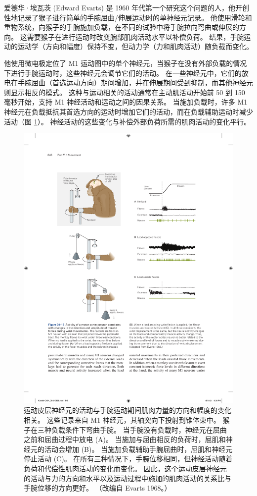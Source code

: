 爱德华·埃瓦茨 (Edward Evarts) 是 1960 年代第一个研究这个问题的人，他开创性地记录了猴子进行简单的手腕屈曲/伸展运动时的单神经元记录。 他使用滑轮和重物系统，向猴子的手腕施加负载，在不同的试验中将手腕拉向弯曲或伸展的方向。 这需要猴子在进行运动时改变腕部肌肉活动水平以补偿负荷。 结果，手腕运动的运动学（方向和幅度）保持不变，但动力学（力和肌肉活动）随负载而变化。

他使用微电极定位了 M1 运动图中的单个神经元，当猴子在没有外部负载的情况下进行手腕运动时，这些神经元会调节它们的活动。 在一些神经元中，它们的放电在手腕屈曲（首选运动方向）期间增加，并在伸展期间受到抑制，而其他神经元则显示相反的模式。 这种与运动相关的活动通常在主动肌活动开始前 50 到 150 毫秒开始，支持 M1 神经活动和运动之间的因果关系。 
当施加负载时，许多 M1 神经元在负载抵抗其首选方向的运动时增加它们的活动，而在负载辅助运动时减少活动（图 \ref{fig:34_18}）。 
神经活动的这些变化与补偿外部负荷所需的肌肉活动的变化平行。

\begin{figure}[htbp]
	\centering
	\includegraphics[width=0.9\linewidth]{chap34/fig_34_18}
	\caption{运动皮层神经元的活动与手腕运动期间肌肉力量的方向和幅度的变化相关。 这些记录来自 M1 神经元，其轴突向下投射到锥体束中。 猴子在三种负载条件下弯曲手腕。 当手腕没有负载时，神经元在屈曲之前和屈曲过程中放电 (A)。 当施加与屈曲相反的负荷时，屈肌和神经元的活动会增加 (B)。 当施加负载辅助手腕屈曲时，屈肌和神经元停止活动 (C)。 在所有三种情况下，手腕位移相同，但神经活动随着负荷和代偿性肌肉活动的变化而变化。 因此，这个运动皮层神经元的活动与力的方向和水平以及运动过程中施加的肌肉活动的关系比与手腕位移的方向更好。 （改编自 Evarts 1968。）}
	\label{fig:34_18}
\end{figure}


